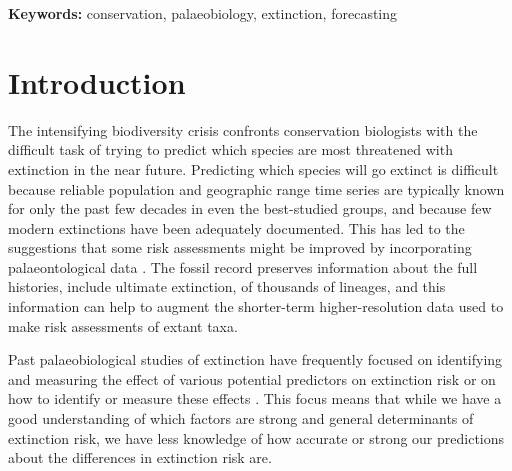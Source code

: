 \documentclass[12pt,letterpaper]{article}
\begin{document}
\begin{refsection}
\begin{abstract}
\end{abstract}

{\bf Keywords:} conservation, palaeobiology, extinction, forecasting



\section{Introduction}

The intensifying biodiversity crisis confronts conservation biologists with the difficult task of trying to predict which species are most threatened with extinction in the near future. Predicting which species will go extinct is difficult because reliable population and geographic range time series are typically known for only the past few decades in even the best-studied groups, and because few modern extinctions have been adequately documented. This has led to the suggestions that some risk assessments might be improved by incorporating palaeontological data \citep{Finnegan2015,Kiessling2016}. The fossil record preserves information about the full histories, include ultimate extinction, of thousands of lineages, and this information can help to augment the shorter-term higher-resolution data used to make risk assessments of extant taxa.

Past palaeobiological studies of extinction have frequently focused on identifying and measuring the effect of various potential predictors on extinction risk \citep{Harnik2011,Smits2015,Peters2008,Payne2007,Harnik2012,Ezard2011,Foote2006} or on how to identify or measure these effects \citep{Alroy2010a,Alroy2014,Alroy2001,Alroy2000,Alroy2000b,Foote2001}. This focus means that while we have a good understanding of which factors are strong and general determinants of extinction risk, we have less knowledge of how accurate or strong our predictions about the differences in extinction risk are. 


\end{refsection}
\end{document}
